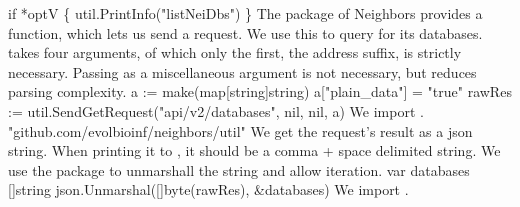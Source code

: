 if *optV \{
          util.PrintInfo("listNeiDbs")
\}
\nwendcode{}\nwdocspar
The  package of Neighbors provides a function, which lets us send a
 request. We use this to query  for its databases.
 takes four arguments, of which only the first, the 
address suffix, is strictly necessary. Passing  as a 
miscellaneous argument is not necessary, but reduces parsing complexity.
\nwenddocs{}\endmoddef\nwstartdeflinemarkup{}\nwenddeflinemarkup
a := make(map[string]string)
a["plain_data"] = "true"
rawRes := util.SendGetRequest("api/v2/databases", nil, nil, a)
\nwendcode{}\nwdocspar
We import .
\nwenddocs{}\plusendmoddef\nwstartdeflinemarkup{}\nwenddeflinemarkup
"github.com/evolbioinf/neighbors/util"
\nwendcode{}\nwdocspar
We get the request's result as a json string. When printing it to
, it should be a comma + space delimited string. We use the
 package to unmarshall the string and allow iteration.
\nwenddocs{}\plusendmoddef\nwstartdeflinemarkup{}\nwenddeflinemarkup
var databases []string
json.Unmarshal([]byte(rawRes), &databases)
\nwendcode{}\nwdocspar
We import .
\nwenddocs{}\plusendmoddef\nwstartdeflinemarkup{}\nwenddeflinemarkup
